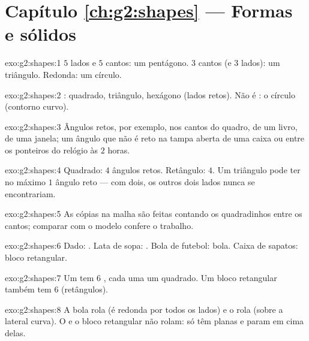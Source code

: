 \section*{Capítulo \ref{ch:g2:shapes} --- Formas e sólidos}

\begin{solution}{exo:g2:shapes:1}
$5$ lados e $5$ cantos: um pentágono. $3$ cantos (e $3$ lados): um
triângulo. Redonda: um círculo.
\end{solution}

\begin{solution}{exo:g2:shapes:2}
: quadrado, triângulo, hexágono (lados retos). Não é
: o círculo (contorno curvo).
\end{solution}

\begin{solution}{exo:g2:shapes:3}
Ângulos retos, por exemplo, nos cantos do quadro, de um livro, de
uma janela; um ângulo que não é reto na tampa aberta de uma caixa ou
entre os ponteiros do relógio às $2$ horas.
\end{solution}

\begin{solution}{exo:g2:shapes:4}
Quadrado: $4$ ângulos retos. Retângulo: $4$. Um triângulo pode ter
no máximo $1$ ângulo reto --- com dois, os outros dois lados nunca
se encontrariam.
\end{solution}

\begin{solution}{exo:g2:shapes:5}
As cópias na malha são feitas contando os quadradinhos entre os
cantos; comparar com o modelo confere o trabalho.
\end{solution}

\begin{solution}{exo:g2:shapes:6}
Dado: . Lata de sopa: . Bola de futebol: bola. Caixa de
sapatos: bloco retangular.
\end{solution}

\begin{solution}{exo:g2:shapes:7}
Um  tem $6$ , cada uma um quadrado. Um bloco retangular
também tem $6$  (retângulos).
\end{solution}

\begin{solution}{exo:g2:shapes:8}
A bola rola (é redonda por todos os lados) e o  rola (sobre
a lateral curva). O  e o bloco retangular não rolam: só têm
 planas e param em cima delas.
\end{solution}

